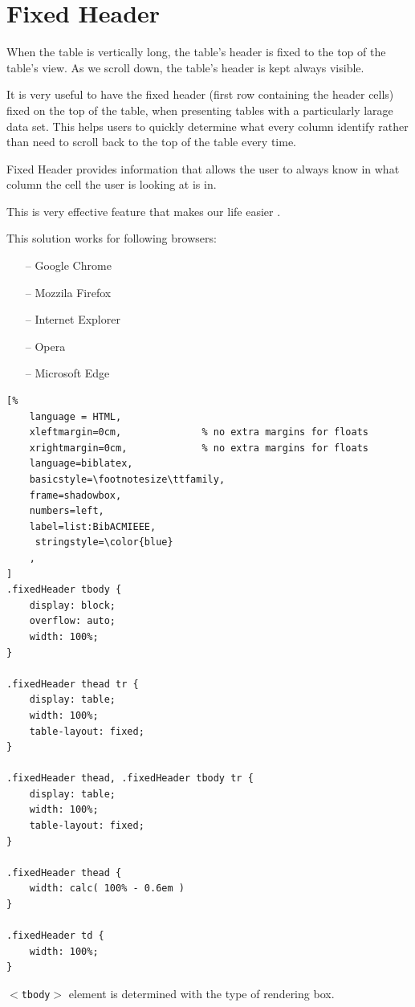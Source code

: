 \newpage
\section{Fixed Header}
When the table is vertically long, the table's header is fixed to the top of the table's view.
As we scroll down, the table's header is kept always visible.

It is very useful to have the fixed header (first row containing the header cells) fixed on the top of the table, when presenting tables with a particularly larage data set. This helps users to quickly determine what every column identify rather than need to scroll back to the top of the table every time.

Fixed Header provides information that allows the user to always know in what column the cell the user is looking at is in.

This is very effective feature that makes our life easier \parencite{HS}.

This solution works for following browsers:
\begin{itemize}
    \item[--] Google Chrome
    \item[--] Mozzila Firefox
    \item[--] Internet Explorer
    \item[--] Opera
    \item[--] Microsoft Edge
\end{itemize}

\begin{lstlisting}[%
    language = HTML,
    xleftmargin=0cm,              % no extra margins for floats
    xrightmargin=0cm,             % no extra margins for floats
    language=biblatex,
    basicstyle=\footnotesize\ttfamily,
    frame=shadowbox,
    numbers=left,
    label=list:BibACMIEEE,
     stringstyle=\color{blue}
    ,
]
.fixedHeader tbody {
    display: block;
    overflow: auto;
    width: 100%;
}

.fixedHeader thead tr {
    display: table;
    width: 100%;
    table-layout: fixed;
}

.fixedHeader thead, .fixedHeader tbody tr {
    display: table;
    width: 100%;
    table-layout: fixed;
}

.fixedHeader thead {
    width: calc( 100% - 0.6em )
}

.fixedHeader td {
    width: 100%;
}

\end{lstlisting}

$<$\texttt{tbody}$>$ element is determined with the type of rendering box.

